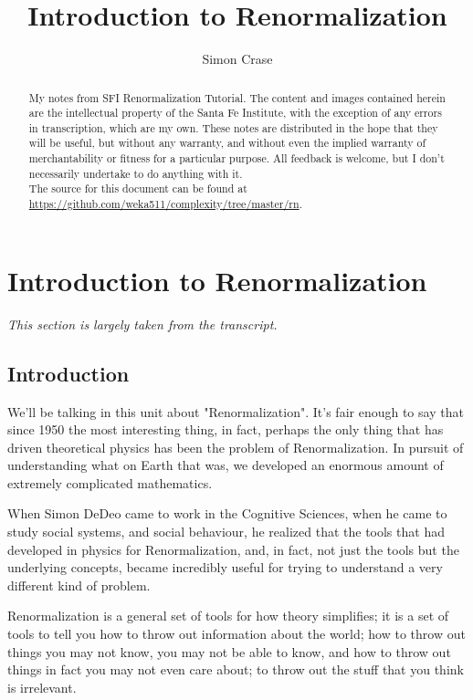 \documentclass[]{article}
\title{Introduction to Renormalization}
\author{Simon Crase}
\begin{document}
\maketitle

\begin{abstract}
My notes from SFI Renormalization Tutorial\cite{dedeo2017renormalization}.
The content and images contained herein are the intellectual property of the Santa Fe Institute, with the exception of any errors in transcription, which are my own. These notes are distributed in the hope that they will be useful,  but without any warranty, and without even the implied warranty of merchantability or fitness for a particular purpose. All feedback is welcome,  but I don't necessarily undertake to do anything with it.\\
The source for this document can be found at\\
\url{https://github.com/weka511/complexity/tree/master/rn}.
\end{abstract}

\tableofcontents
\listoffigures
{}

\section{Introduction to Renormalization}

\textit{This section is largely taken from the transcript.}

\subsection{Introduction}

We'll be talking in this unit about "Renormalization". It's fair enough to say that since 1950 the most interesting thing, in fact, perhaps the only thing that has driven theoretical physics has been the problem of Renormalization. In pursuit of understanding what on Earth that was, we developed an enormous amount of extremely complicated mathematics.

When Simon DeDeo came to work in the Cognitive Sciences, when he came to study social systems, and social behaviour,  he realized  that the tools that had developed in physics for Renormalization, and, in fact, not just the tools but the underlying concepts, became incredibly useful for trying to understand a very different kind of problem.

Renormalization is a general set of tools for how theory simplifies; it is a set of tools to tell you how to throw out information about the world; how to throw out things you may not know, you may not be able to know, and how to throw out 
things in fact you may not even care about; to throw out the stuff that you think is irrelevant.
\end{document}
